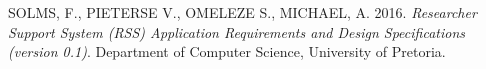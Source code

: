 SOLMS, F., PIETERSE V., OMELEZE S., MICHAEL, A. 2016. \textit{Researcher Support System (RSS) Application Requirements and Design Speciﬁcations (version 0.1)}. Department of Computer Science, University of Pretoria.